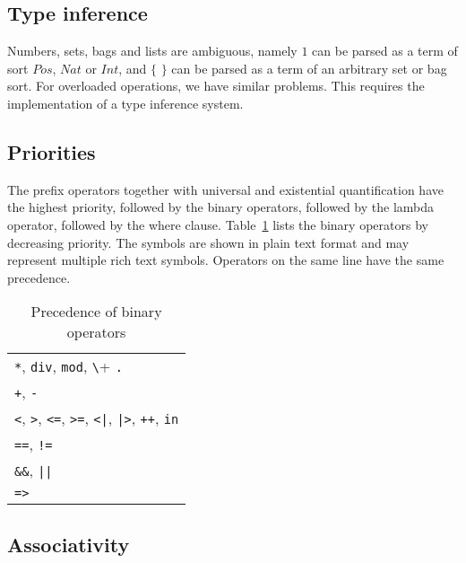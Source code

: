 \documentclass[a4paper,fleqn]{article}
\newcommand{\frm}[1]{\mbox{\ensuremath{#1}}}
\newcommand{\f}[1]{\ensuremath{\mathit{#1}}}
\newcommand{\set}[1]{\ensuremath{\{\,#1\,\}}}
\newcommand{\srtpos}{\f{Pos}}
\newcommand{\srtnat}{\f{Nat}}
\newcommand{\srtint}{\f{Int}}
\begin{document}
\subsection{Type inference}

Numbers, sets, bags and lists are ambiguous, namely \frm{1} can be parsed as a term of sort \frm{\srtpos}, \frm{\srtnat} or \frm{\srtint}, and \frm{\set{}} can be parsed as a term of an arbitrary set or bag sort. For overloaded operations, we have similar problems. This requires the implementation of a type inference system.

\subsection{Priorities}

The prefix operators together with universal and existential quantification have the highest priority, followed by the binary operators, followed by the lambda operator, followed by the where clause. Table~\ref{tab:precedence} lists the binary operators by decreasing priority. The symbols are shown in plain text format and may represent multiple rich text symbols. Operators on the same line have the same precedence.
\begin{table}[h!bt]
\centering
\begin{tabular}{|l|}
\hline
\verb+*+, \verb+div+, \verb+mod+, \verb+\+ \verb+.+\\
\verb-+-, \verb+-+\\
\verb+<+, \verb+>+, \verb+<=+, \verb+>=+, \verb+<|+, \verb+|>+, \verb-++-, \verb+in+\\
\verb+==+, \verb+!=+\\
\verb+&&+, \verb+||+\\
\verb+=>+\\\hline
\end{tabular}
\caption{Precedence of binary operators}
\label{tab:precedence}
\end{table}

\subsection{Associativity}
\end{document}

